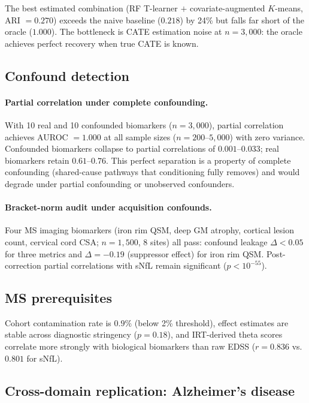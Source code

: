 \documentclass{article}
\begin{document}
The best estimated combination (RF T-learner $+$ covariate-augmented $K$-means, ARI $= 0.270$) exceeds the naive baseline ($0.218$) by 24\% but falls far short of the oracle ($1.000$).
The bottleneck is CATE estimation noise at $n = 3{,}000$: the oracle achieves perfect recovery when true CATE is known.

\subsection{Confound detection}
\label{sec:res-confound}

\paragraph{Partial correlation under complete confounding.}
With 10 real and 10 confounded biomarkers ($n = 3{,}000$), partial correlation achieves AUROC $= 1.000$ at all sample sizes ($n = 200$--$5{,}000$) with zero variance.
Confounded biomarkers collapse to partial correlations of $0.001$--$0.033$; real biomarkers retain $0.61$--$0.76$.
This perfect separation is a property of complete confounding (shared-cause pathways that conditioning fully removes) and would degrade under partial confounding or unobserved confounders.

\paragraph{Bracket-norm audit under acquisition confounds.}
Four MS imaging biomarkers (iron rim QSM, deep GM atrophy, cortical lesion count, cervical cord CSA; $n = 1{,}500$, 8 sites) all pass: confound leakage $\Delta < 0.05$ for three metrics and $\Delta = -0.19$ (suppressor effect) for iron rim QSM.
Post-correction partial correlations with sNfL remain significant ($p < 10^{-55}$).

\subsection{MS prerequisites}

Cohort contamination rate is $0.9\%$ (below 2\% threshold), effect estimates are stable across diagnostic stringency ($p = 0.18$), and IRT-derived theta scores correlate more strongly with biological biomarkers than raw EDSS ($r = 0.836$ vs.\ $0.801$ for sNfL).

\subsection{Cross-domain replication: Alzheimer's disease}
\label{sec:ad}
\label{sec:res-ad}
\end{document}
